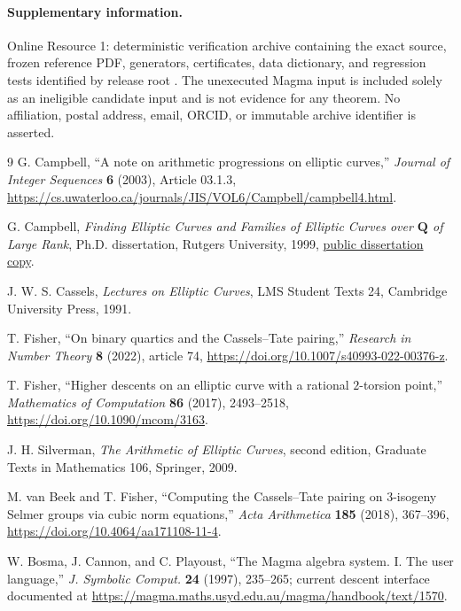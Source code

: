 \documentclass[11pt]{article}
\newcommand{\Q}{\mathbf Q}
\begin{document}
\paragraph{Supplementary information.}
Online Resource 1: deterministic verification archive containing the exact
source, frozen reference PDF, generators, certificates, data dictionary, and regression tests
identified by release root
.  The unexecuted Magma
input is included solely as an ineligible candidate input and is not evidence
for any theorem.  No affiliation, postal address, email, ORCID, or immutable
archive identifier is asserted.

{\small
\begin{thebibliography}{9}
G. Campbell,
``A note on arithmetic progressions on elliptic curves,''
\emph{Journal of Integer Sequences} \textbf{6} (2003), Article 03.1.3,
\url{https://cs.uwaterloo.ca/journals/JIS/VOL6/Campbell/campbell4.html}.

G. Campbell,
\emph{Finding Elliptic Curves and Families of Elliptic Curves over $\Q$ of
Large Rank}, Ph.D. dissertation, Rutgers University, 1999,
\href{https://ctnt-summer.math.uconn.edu/wp-content/uploads/sites/1632/2020/06/Campbell-Finding-elliptic-curves-and-families-of-elliptic-curves-over-Q-of-large-rank.pdf}{public dissertation copy}.

J. W. S. Cassels,
\emph{Lectures on Elliptic Curves}, LMS Student Texts 24,
Cambridge University Press, 1991.

T. Fisher,
``On binary quartics and the Cassels--Tate pairing,''
\emph{Research in Number Theory} \textbf{8} (2022), article 74,
\url{https://doi.org/10.1007/s40993-022-00376-z}.

T. Fisher,
``Higher descents on an elliptic curve with a rational $2$-torsion point,''
\emph{Mathematics of Computation} \textbf{86} (2017), 2493--2518,
\url{https://doi.org/10.1090/mcom/3163}.

J. H. Silverman,
\emph{The Arithmetic of Elliptic Curves}, second edition,
Graduate Texts in Mathematics 106, Springer, 2009.

M. van Beek and T. Fisher,
``Computing the Cassels--Tate pairing on 3-isogeny Selmer groups via cubic
norm equations,'' \emph{Acta Arithmetica} \textbf{185} (2018), 367--396,
\url{https://doi.org/10.4064/aa171108-11-4}.

W. Bosma, J. Cannon, and C. Playoust,
``The Magma algebra system. I. The user language,''
\emph{J. Symbolic Comput.} \textbf{24} (1997), 235--265;
current descent interface documented at
\url{https://magma.maths.usyd.edu.au/magma/handbook/text/1570}.
\end{thebibliography}
}
\end{document}
